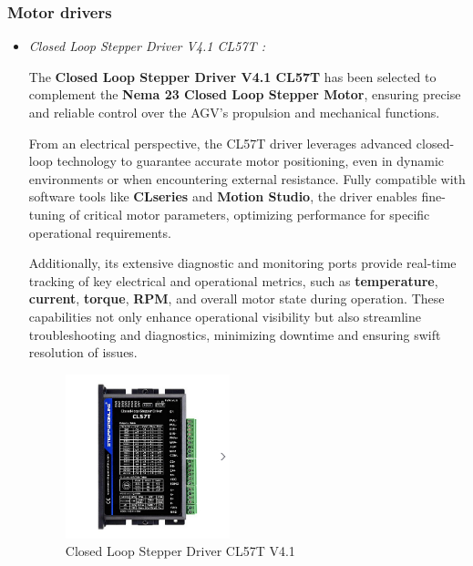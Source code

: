 \documentclass[../../main]{subfiles}
\begin{document}
\newpage
\subsubsection{Motor drivers}

\begin{itemize}
    \item 
\textit{Closed Loop Stepper Driver V4.1 CL57T : }

The \textbf{Closed Loop Stepper Driver V4.1 CL57T} has been selected 
to complement the \textbf{Nema 23 Closed Loop Stepper Motor}, 
ensuring precise and reliable control over the AGV's propulsion and mechanical functions. 

From an electrical perspective, the CL57T driver leverages 
advanced closed-loop technology to guarantee accurate motor positioning, 
even in dynamic environments or when encountering external resistance. 
Fully compatible with software tools like \textbf{CLseries} and \textbf{Motion Studio}, 
the driver enables fine-tuning of critical motor parameters, optimizing performance 
for specific operational requirements. 

Additionally, its extensive diagnostic and monitoring ports provide 
real-time tracking of key electrical and operational metrics, 
such as \textbf{temperature}, \textbf{current}, \textbf{torque}, \textbf{RPM}, 
and overall motor state during operation. These capabilities not only enhance operational 
visibility but also streamline troubleshooting and diagnostics, minimizing downtime and ensuring swift resolution of issues. 


\begin{figure}[H]
    \centering
    \includegraphics[width=0.45\textwidth]{fig/stepper_driver.png}
    \caption{ Closed Loop Stepper Driver CL57T V4.1 }
    \label{Stepper motor driver } %
\end{figure}


\end{itemize}
\end{document}
